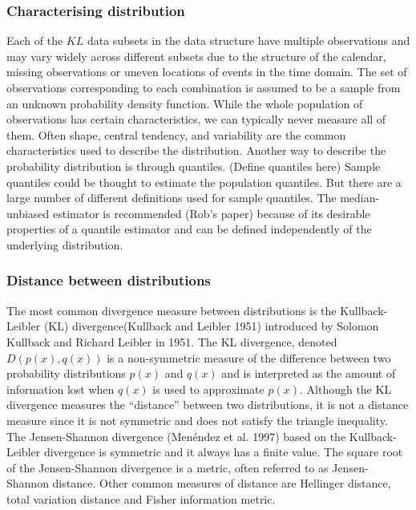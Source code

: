 \documentclass[
]{article}
\begin{document}
\hypertarget{characterising-distribution}{%
\subsubsection{Characterising distribution}\label{characterising-distribution}}

Each of the \(KL\) data subsets in the data structure have multiple observations and may vary widely across different subsets due to the structure of the calendar, missing observations or uneven locations of events in the time domain. The set of observations corresponding to each combination is assumed to be a sample from an unknown probability density function.
While the whole population of observations has certain characteristics, we can typically never measure all of them. Often shape, central tendency, and variability are the common characteristics used to describe the distribution. Another way to describe the probability distribution is through quantiles. (Define quantiles here) Sample quantiles could be thought to estimate the population quantiles. But there are a large number of different definitions used for sample quantiles. The median-unbiased estimator is recommended (Rob's paper) because of its desirable properties of a quantile estimator and can be defined independently of the underlying distribution.

\hypertarget{distance-between-distributions}{%
\subsubsection{Distance between distributions}\label{distance-between-distributions}}

The most common divergence measure between distributions is the Kullback-Leibler (KL) divergence(Kullback and Leibler 1951) introduced by Solomon Kullback and Richard Leibler in 1951. The KL divergence, denoted \(D(p(x), q(x))\) is a non-symmetric measure of the difference between two probability distributions \(p(x)\) and \(q(x)\) and is interpreted as the amount of information lost when \(q(x)\) is used to approximate \(p(x)\). Although the KL divergence measures the ``distance'' between two distributions, it is not a distance measure since it is not symmetric and does not satisfy the triangle inequality. The Jensen-Shannon divergence (Menéndez et al. 1997) based on the Kullback-Leibler divergence is symmetric and it always has a finite value. The square root of the Jensen-Shannon divergence is a metric, often referred to as Jensen-Shannon distance. Other common measures of distance are Hellinger distance, total variation distance and Fisher information metric.
\end{document}
